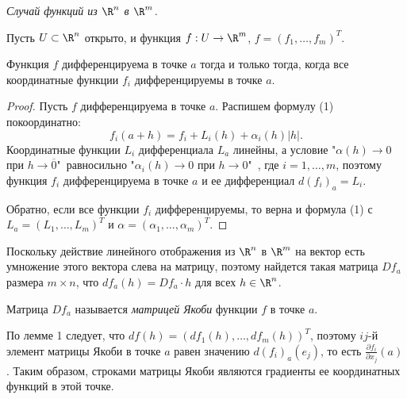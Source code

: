\textit{Случай функций из $\R^{n}$ в $\R^{m}$.}

Пусть $U \subset \R^{n}$ открыто, и функция $f: U \to \R^{m}$, $f = (f_{1}, \ldots, f_{m})^{T}$.

\begin{lemma}
    \label{dif-lem1}
    Функция $f$ дифференцируема в точке $a$ тогда и только тогда, когда все координатные функции $f_{i}$ дифференцируемы в точке $a$.
\end{lemma}

\begin{proof}
    Пусть $f$ дифференцируема в точке $a$. Распишем формулу (1) покоординатно:
    \[f_{i}(a + h) = f_{i} + L_{i}(h) + \alpha_{i}(h)|h|.\]
    Координатные функции $L_{i}$ дифференциала $L_{a}$ линейны, а условие "$\alpha(h) \to 0$ при $h \to \overline{0}$"\ равносильно "$\alpha_{i}(h) \to 0$ при $h \to 0$"\ , где $i = 1, \ldots, m$, поэтому функция $f_{i}$ дифференцируема в точке $a$ и ее дифференциал $d(f_{i})_{a} = L_{i}$.

    Обратно, если все функции $f_{i}$ дифференцируемы, то верна и формула (1) с $L_{a} = (L_{1}, \ldots, L_{m})^{T}$ и $\alpha = (\alpha_{1}, \ldots, \alpha_{m})^{T}$.
\end{proof}

Поскольку действие линейного отображения из $\R^{n}$ в $\R^{m}$ на вектор есть умножение этого вектора слева на матрицу, поэтому найдется такая матрица $Df_{a}$ размера $m \times n$, что $df_{a}(h) = D f_{a} \cdot h$ для всех $h \in \R^{n}$.

\begin{definition}
    Матрица $Df_{a}$ называется \textit{матрицей Якоби} функции $f$ в точке $a$.
\end{definition}

\begin{note}
    По лемме 1 следует, что $df(h) = (df_{1}(h), \ldots, df_{m}(h))^{T}$, поэтому $ij$-й элемент матрицы Якоби в точке $a$ равен значению $d(f_{i})_{a}(e_{j})$, то есть $\frac{\partial f_{i}}{\partial x_{j}}(a)$. Таким образом, строками матрицы Якоби являются градиенты ее координатных функций в этой точке.
\end{note}